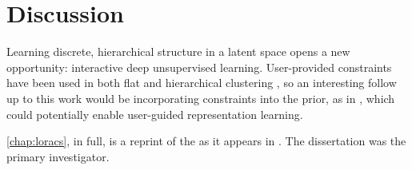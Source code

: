 \section{Discussion}
Learning discrete, hierarchical structure in a latent space
opens a new opportunity:
interactive deep unsupervised learning.
User-provided constraints have been used
in both flat and
hierarchical clustering \citep{Wagstaff2000,Awasthi2010}, so an interesting
follow up to this work would be incorporating
constraints into the \acronym\; prior, as
in \citet{Vikram2016}, which could potentially
enable user-guided representation learning.

\autoref{chap:loracs}, in full, is a reprint of the
as it appears in . The
dissertation was the primary investigator.
